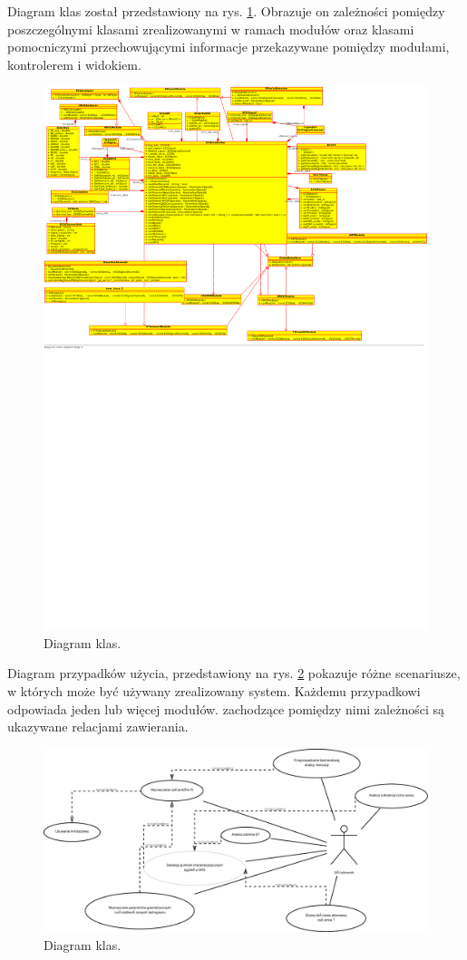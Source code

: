 \documentclass[a4paper, 11pt]{article}
\begin{document}
Diagram klas został przedstawiony na rys. \ref{fig:class_diagram}. Obrazuje on zależności pomiędzy poszczególnymi klasami zrealizowanymi w ramach modułów oraz klasami pomocniczymi przechowującymi informacje przekazywane pomiędzy modułami, kontrolerem i widokiem.

\begin{figure}[h!]
  \centering
  \includegraphics[width=0.9\linewidth]{include/class_diagram}
  \caption{Diagram klas.}
  \label{fig:class_diagram}
\end{figure}

Diagram przypadków użycia, przedstawiony na rys. \ref{fig:use_case_diagram} pokazuje różne scenariusze, w których może być używany zrealizowany system. Każdemu przypadkowi odpowiada jeden lub więcej modułów. zachodzące pomiędzy nimi zależności są ukazywane relacjami zawierania.
\begin{figure}[h!]
  \centering
  \includegraphics[width=\linewidth]{include/use_case_diagram}
  \caption{Diagram klas.}
  \label{fig:use_case_diagram}
\end{figure}
\end{document}
